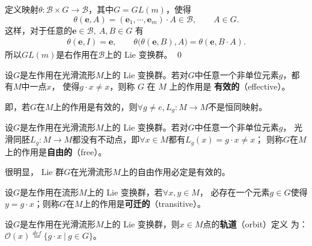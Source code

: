 定义映射$\theta: \mathscr{B} \times G \rightarrow \mathscr{B}$，其中$G=GL(m)$，使得
\begin{equation*}
    \theta(\boldsymbol{e}, A)=\left(\boldsymbol{e}_1, \cdots, 
    \boldsymbol{e}_m\right) \cdot A \in \mathscr{B},\qquad A\in G .
\end{equation*}
这样，对于任意的$\boldsymbol{e} \in \mathscr{B},\ A, B \in G$ 有
\begin{align*}
    \theta(\boldsymbol{e}, I) =\boldsymbol{e}, \qquad
    \theta\bigl(\theta(\boldsymbol{e}, B), A\bigr)  
    =\theta(\boldsymbol{e}, B \cdot A).
\end{align*}
所以$GL(m)$是右作用在$\mathscr{B}$上的 Lie 变换群。
\qed


\begin{definition}
    设$G$是左作用在光滑流形$M$上的 Lie 变换群。若对$G$中任意一个非单位元素$g$，都有$M$中一点$x$，
    使得$g \cdot x \neq x$，则称 $G$ 在 $M$ 上的作用是\textbf{ 有效的}（effective）。
\end{definition}

即，若$G$在$M$上的作用是有效的，则$\forall g \neq e, L_{g}: M \rightarrow M$不是恒同映射。


\begin{definition}
    设$G$是左作用在光滑流形$M$上的 Lie 变换群。若对$G$中任意一个非单位元素$g$，
    光滑同胚$L_g: M \rightarrow M$都没有不动点，即$\forall x \in M$都有$L_g(x)=g \cdot x \neq x$；
    则称$G$在$M$上的作用是\textbf{自由的}（free）。
\end{definition}


很明显， Lie 群$G$在光滑流形$M$上的自由作用必定是有效的。 


\begin{definition}
    设$G$是左作用在流形$M$上的 Lie 变换群，若$\forall x, y \in M$，
    必存在一个元素$g \in G$使得$y=g \cdot x$；则称$G$在$M$上的作用是\textbf{可迁的}（transitive）。    
\end{definition}



\begin{definition}
    设$G$是左作用在光滑流形$M$上的 Lie 变换群，则$x \in M$点的\textbf{轨道}（orbit）定义
    为：$\mathcal{O}(x) \overset{def}{=} \{ g\cdot x \ | \  g\in G \}$。
\end{definition}

